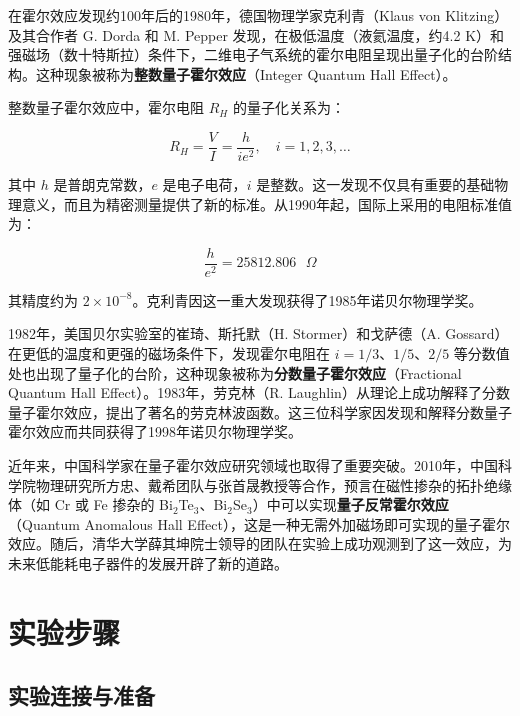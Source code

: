 ﻿\documentclass[12pt,a4paper]{article}
\begin{document}
在霍尔效应发现约100年后的1980年，德国物理学家克利青（Klaus von Klitzing）及其合作者 G. Dorda 和 M. Pepper 发现，在极低温度（液氦温度，约4.2 K）和强磁场（数十特斯拉）条件下，二维电子气系统的霍尔电阻呈现出量子化的台阶结构。这种现象被称为\textbf{整数量子霍尔效应}（Integer Quantum Hall Effect）。

整数量子霍尔效应中，霍尔电阻 $R_H$ 的量子化关系为：

\begin{equation}
R_H = \frac{V}{I} = \frac{h}{i e^2}, \quad i = 1, 2, 3, \ldots
\end{equation}

其中 $h$ 是普朗克常数，$e$ 是电子电荷，$i$ 是整数。这一发现不仅具有重要的基础物理意义，而且为精密测量提供了新的标准。从1990年起，国际上采用的电阻标准值为：

\begin{equation}
\frac{h}{e^2} = 25812.806 \text{ } \Omega
\end{equation}

其精度约为 $2 \times 10^{-8}$。克利青因这一重大发现获得了1985年诺贝尔物理学奖。

1982年，美国贝尔实验室的崔琦、斯托默（H. Stormer）和戈萨德（A. Gossard）在更低的温度和更强的磁场条件下，发现霍尔电阻在 $i = 1/3$、$1/5$、$2/5$ 等分数值处也出现了量子化的台阶，这种现象被称为\textbf{分数量子霍尔效应}（Fractional Quantum Hall Effect）。1983年，劳克林（R. Laughlin）从理论上成功解释了分数量子霍尔效应，提出了著名的劳克林波函数。这三位科学家因发现和解释分数量子霍尔效应而共同获得了1998年诺贝尔物理学奖。

近年来，中国科学家在量子霍尔效应研究领域也取得了重要突破。2010年，中国科学院物理研究所方忠、戴希团队与张首晟教授等合作，预言在磁性掺杂的拓扑绝缘体（如 Cr 或 Fe 掺杂的 Bi$_2$Te$_3$、Bi$_2$Se$_3$）中可以实现\textbf{量子反常霍尔效应}（Quantum Anomalous Hall Effect），这是一种无需外加磁场即可实现的量子霍尔效应。随后，清华大学薛其坤院士领导的团队在实验上成功观测到了这一效应，为未来低能耗电子器件的发展开辟了新的道路。

\section{实验步骤}

\subsection{实验连接与准备}
\end{document}

